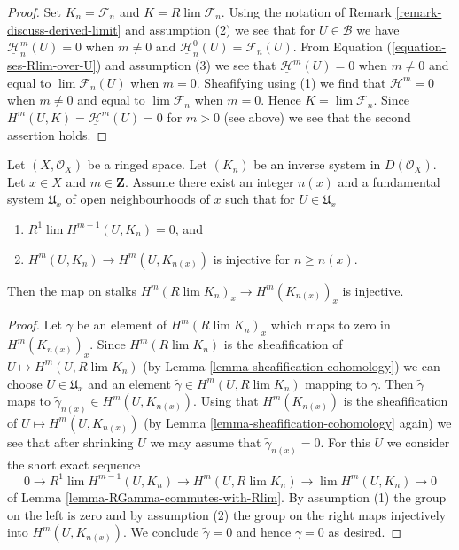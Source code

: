\begin{proof}
Set $K_n = \mathcal{F}_n$ and $K = R\lim \mathcal{F}_n$. Using the notation
of Remark \ref{remark-discuss-derived-limit} and assumption (2) we see that for
$U \in \mathcal{B}$ we have $\underline{\mathcal{H}}_n^m(U) = 0$
when $m \not = 0$ and $\underline{\mathcal{H}}_n^0(U) = \mathcal{F}_n(U)$.
From Equation (\ref{equation-ses-Rlim-over-U}) and assumption (3)
we see that $\underline{\mathcal{H}}^m(U) = 0$
when $m \not = 0$ and equal to $\lim \mathcal{F}_n(U)$
when $m = 0$. Sheafifying using (1) we find that
$\mathcal{H}^m = 0$ when $m \not = 0$ and equal to
$\lim \mathcal{F}_n$ when $m = 0$. Hence $K = \lim \mathcal{F}_n$.
Since $H^m(U, K) = \underline{\mathcal{H}}^m(U) = 0$ for $m > 0$
(see above) we see that the second assertion holds.
\end{proof}

\begin{lemma}
\label{lemma-cohomology-derived-limit-injective}
Let $(X, \mathcal{O}_X)$ be a ringed space. Let $(K_n)$ be an
inverse system in $D(\mathcal{O}_X)$. Let $x \in X$ and $m \in \mathbf{Z}$.
Assume there exist an integer $n(x)$ and a fundamental system $\mathfrak{U}_x$
of open neighbourhoods of $x$ such that for $U \in \mathfrak{U}_x$
\begin{enumerate}
\item $R^1\lim H^{m - 1}(U, K_n) = 0$, and
\item $H^m(U, K_n) \to H^m(U, K_{n(x)})$ is injective
for $n \geq n(x)$.
\end{enumerate}
Then the map on stalks $H^m(R\lim K_n)_x \to H^m(K_{n(x)})_x$ is injective.
\end{lemma}

\begin{proof}
Let $\gamma$ be an element of $H^m(R\lim K_n)_x$ which maps to zero
in $H^m(K_{n(x)})_x$. Since $H^m(R\lim K_n)$ is the sheafification
of $U \mapsto H^m(U, R\lim K_n)$
(by Lemma \ref{lemma-sheafification-cohomology})
we can choose $U \in \mathfrak{U}_x$
and an element $\tilde \gamma \in H^m(U, R\lim K_n)$ mapping to $\gamma$.
Then $\tilde\gamma$ maps to $\tilde\gamma_{n(x)} \in H^m(U, K_{n(x)})$.
Using that $H^m(K_{n(x)})$ is the sheafification of
$U \mapsto H^m(U, K_{n(x)})$
(by Lemma \ref{lemma-sheafification-cohomology} again)
we see that after shrinking $U$ we may assume that $\tilde\gamma_{n(x)} = 0$.
For this $U$ we consider the short exact sequence
$$
0 \to
R^1\lim H^{m - 1}(U, K_n) \to H^m(U, R\lim K_n) \to
\lim H^m(U, K_n) \to 0
$$
of Lemma \ref{lemma-RGamma-commutes-with-Rlim}.
By assumption (1) the group on the left is zero and by
assumption (2) the group on the right maps injectively
into $H^m(U, K_{n(x)})$. We conclude $\tilde\gamma = 0$
and hence $\gamma = 0$ as desired.
\end{proof}

